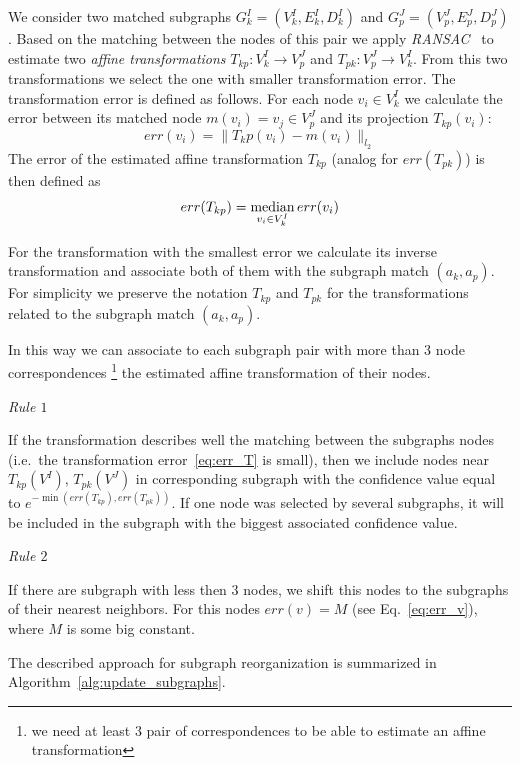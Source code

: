 We consider two matched subgraphs $G^I_k=(V^I_k, E^I_k, D^I_k)$ and  $G^J_p=(V^J_p, E^J_p, D^J_p)$. Based on the matching between the nodes of this pair we apply \emph{RANSAC}~\cite{RANSAC} to estimate two \emph{affine transformations} $T_{kp}:V^I_k\rightarrow V^J_p$ and $T_{pk}:V^J_p\rightarrow V^I_k$. From this two transformations we select the one with smaller transformation error. The transformation error is defined as follows. For each node $v_i\in V^I_k$ we calculate the error between its matched node $m(v_i) = v_j\in V^J_p$ and its projection $T_{kp}(v_i)$: 
\begin{equation} \label{eq:err_v}
err(v_i) = \|T_kp(v_i) - m(v_i)\|_{l_2}
\end{equation}
The error of the estimated affine transformation $T_{kp}$ (analog for  $err(T_{pk})$) is then defined as
\begin{equation} \label{eq:err_T}
err(T_{kp}) = \mathop{\rm median}_{v_i\in V^I_k}err(v_i)
\end{equation}

For the transformation with the smallest error we calculate its inverse transformation and associate both of them with the subgraph match $(a_k, a_p)$. For simplicity we preserve the notation $T_{kp}$ and $T_{pk}$ for the transformations related to the subgraph match $(a_k, a_p)$.

In this way we can associate to each subgraph pair with more than $3$ node correspondences \footnote{we need at least $3$ pair of correspondences to be able to estimate an affine transformation} the estimated affine transformation of their nodes.

\textit{Rule $1$}

If the transformation describes well the matching between the subgraphs nodes (i.e.\ the transformation error~\ref{eq:err_T} is small), then we include nodes near $T_{kp}(V^I)$, $T_{pk}(V^J)$ in corresponding subgraph with the confidence value equal to $e^{-\min(err(T_{kp}), err(T_{pk}))}$. If one node was selected by several subgraphs, it will be included in the subgraph with the biggest associated confidence value.

\textit{Rule $2$}

If there are subgraph with less then $3$ nodes, we shift this nodes to the subgraphs of their nearest neighbors. For this nodes $err(v)=M$ (see Eq.~\ref{eq:err_v}), where $M$ is some big constant. 

The described approach for subgraph reorganization is summarized in Algorithm~\ref{alg:update_subgraphs}.

